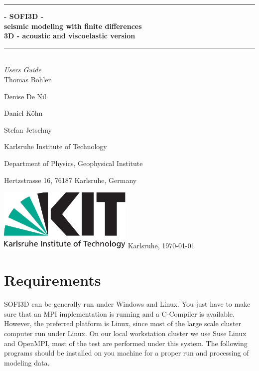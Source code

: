 \documentclass[11pt,onecolumn,oneside]{article}
\begin{document}
\thispagestyle{empty}
\newcommand{\Rule}{\rule{\textwidth}{1mm}}
\newtheorem{theorem}{Hypothese}[section]
\begin{center}
\Rule \vspace{5mm}
\sffamily \bfseries \Huge
- SOFI3D - \\ 
seismic modeling with finite differences \\
3D - acoustic and viscoelastic version
\vspace{1mm}\Rule\\
\vspace{1 cm}
\Large\emph{Users Guide}\\
\vspace{2 cm}
\large Thomas Bohlen \par
\large Denise De Nil \par
\large Daniel K\"ohn \par
\large Stefan Jetschny\par
\vspace{2 cm}

\small Karlsruhe Institute of Technology\par
\small Department of Physics, Geophysical Institute \par
\small Hertzstrasse 16, 76187 Karlsruhe, Germany \par

\vfill
\includegraphics[height=30mm]{eps/kit_logo_en_4c_positiv.pdf}
\vfill
\large Karlsruhe, \today
\end{center}
\cleardoublepage
\thispagestyle{empty} 
\cleardoublepage
\thispagestyle{empty}
\ClearShipoutPicture

\tableofcontents
\newpage
\section{Requirements}
\label{requirements}

SOFI3D can be generally run under Windows and Linux. You just have to make sure that an MPI implementation is running and a C-Compiler is available. However, the preferred platform is Linux, since most of the large scale cluster computer run under Linux. On our local workstation cluster we use Suse Linux and OpenMPI, most of the test are performed under this system. The following programs should be installed on you machine for a proper run and processing of modeling data. 
\end{document}
